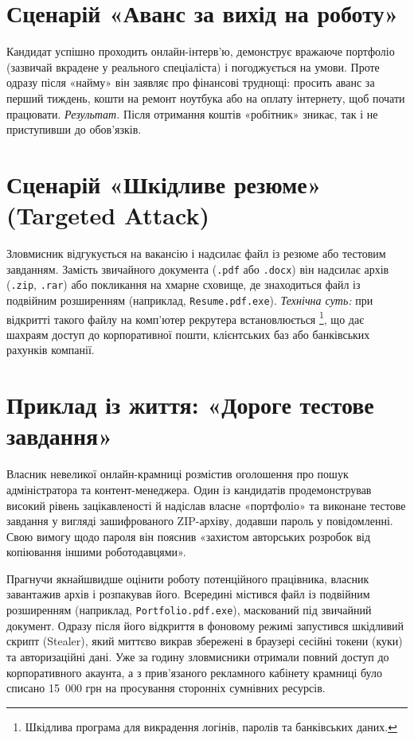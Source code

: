 \section{Сценарій «Аванс за вихід на роботу»}

Кандидат успішно проходить онлайн-інтерв'ю, демонструє вражаюче портфоліо (зазвичай вкрадене у реального спеціаліста) і погоджується на умови. Проте одразу після «найму» він заявляє про фінансові труднощі: просить аванс за перший тиждень, кошти на ремонт ноутбука або на оплату інтернету, щоб почати працювати.
\textit{Результат.} Після отримання коштів «робітник» зникає, так і не приступивши до обов'язків.

\vspace{0.3cm}
\section{Сценарій «Шкідливе резюме» (Targeted Attack)}

Зловмисник відгукується на вакансію і надсилає файл із резюме або тестовим завданням. Замість звичайного документа (\texttt{.pdf} або \texttt{.docx}) він надсилає архів (\texttt{.zip}, \texttt{.rar}) або покликання на хмарне сховище, де знаходиться файл із подвійним розширенням (наприклад, \texttt{Resume.pdf.exe}). 
\textit{Технічна суть:} при відкритті такого файлу на комп'ютер рекрутера встановлюється \footnote{Шкідлива програма для викрадення логінів, паролів та банківських даних.}, що дає шахраям доступ до корпоративної пошти, клієнтських баз або банківських рахунків компанії.


\section{Приклад із життя: «Дороге тестове завдання»}

Власник невеликої онлайн-крамниці розмістив оголошення про пошук адміністратора та контент-менеджера. Один із кандидатів продемонстрував високий рівень зацікавленості й надіслав власне «портфоліо» та виконане тестове завдання у вигляді зашифрованого ZIP-архіву, додавши пароль у повідомленні. Свою вимогу щодо пароля він пояснив «захистом авторських розробок від копіювання іншими роботодавцями». 

Прагнучи якнайшвидше оцінити роботу потенційного працівника, власник завантажив архів і розпакував його. Всередині містився файл із подвійним розширенням (наприклад, \texttt{Portfolio.pdf.exe}), маскований під звичайний документ. Одразу після його відкриття в фоновому режимі запустився шкідливий скрипт (Stealer), який миттєво викрав збережені в браузері сесійні токени (куки) та авторизаційні дані. Уже за годину зловмисники отримали повний доступ до корпоративного акаунта, а з прив’язаного рекламного кабінету крамниці було списано 15~000 грн на просування сторонніх сумнівних ресурсів.

